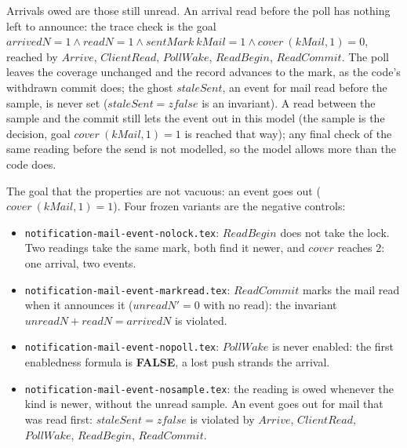 \documentclass[a4paper,10pt,fleqn]{article}
\begin{document}
Arrivals owed are those still unread.  An arrival read before the poll has nothing
left to announce: the trace check is the goal $arrivedN = 1 \land readN = 1 \land
sentMark~kMail = 1 \land cover~(kMail, 1) = 0$, reached by $Arrive$, $ClientRead$,
$PollWake$, $ReadBegin$, $ReadCommit$.  The poll leaves the coverage unchanged and
the record advances to the mark, as the code's withdrawn commit does; the ghost
$staleSent$, an event for mail read before the sample, is never set
($staleSent = zfalse$ is an invariant).
A read between the sample and the commit still lets the event out in this model
(the sample is the decision, goal $cover~(kMail, 1) = 1$ is reached that way); any
final check of the same reading before the send is not modelled, so the model
allows more than the code does.

The goal that the properties are not vacuous: an event goes out
($cover~(kMail, 1) = 1$).  Four frozen variants are the negative controls:

\begin{itemize}
  \item \texttt{notification-mail-event-nolock.tex}: $ReadBegin$ does not take the
    lock.  Two readings take the same mark, both find it newer, and $cover$
    reaches $2$: one arrival, two events.
  \item \texttt{notification-mail-event-markread.tex}: $ReadCommit$ marks the mail
    read when it announces it ($unreadN' = 0$ with no read): the invariant
    $unreadN + readN = arrivedN$ is violated.
  \item \texttt{notification-mail-event-nopoll.tex}: $PollWake$ is never enabled:
    the first enabledness formula is \textbf{FALSE}, a lost push strands the
    arrival.
  \item \texttt{notification-mail-event-nosample.tex}: the reading is owed whenever
    the kind is newer, without the unread sample.  An event goes out for mail that
    was read first: $staleSent = zfalse$ is violated by $Arrive$, $ClientRead$,
    $PollWake$, $ReadBegin$, $ReadCommit$.
\end{itemize}
\end{document}

